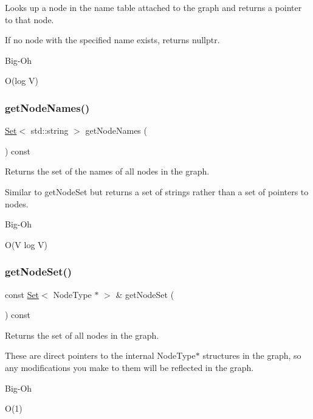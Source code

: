 Looks up a node in the name table attached to the graph and returns a pointer to that node. 

If no node with the specified name exists, returns {\ttfamily nullptr}. \begin{DoxyRefDesc}{Big-\/\+Oh}
\item[\mbox{\hyperlink{BigOh__BigOh000075}{Big-\/\+Oh}}]O(log V) \end{DoxyRefDesc}
\mbox{\label{classGraph_a3c6f37932f377dd2bf4fec61343a916d}} 
\subsubsection{\texorpdfstring{get\+Node\+Names()}{getNodeNames()}}
{\footnotesize\ttfamily \mbox{\hyperlink{classstanfordcpplib_1_1collections_1_1GenericSet}{Set}}$<$ std\+::string $>$ get\+Node\+Names (\begin{DoxyParamCaption}{ }\end{DoxyParamCaption}) const}



Returns the set of the names of all nodes in the graph. 

Similar to get\+Node\+Set but returns a set of strings rather than a set of pointers to nodes. \begin{DoxyRefDesc}{Big-\/\+Oh}
\item[\mbox{\hyperlink{BigOh__BigOh000076}{Big-\/\+Oh}}]O(\+V log V) \end{DoxyRefDesc}
\mbox{\label{classGraph_abd5552888f57aaa581099e8146c617c9}} 
\subsubsection{\texorpdfstring{get\+Node\+Set()}{getNodeSet()}}
{\footnotesize\ttfamily const \mbox{\hyperlink{classstanfordcpplib_1_1collections_1_1GenericSet}{Set}}$<$ Node\+Type $\ast$ $>$ \& get\+Node\+Set (\begin{DoxyParamCaption}{ }\end{DoxyParamCaption}) const}



Returns the set of all nodes in the graph. 

These are direct pointers to the internal Node\+Type$\ast$ structures in the graph, so any modifications you make to them will be reflected in the graph. \begin{DoxyRefDesc}{Big-\/\+Oh}
\item[\mbox{\hyperlink{BigOh__BigOh000077}{Big-\/\+Oh}}]O(1) \end{DoxyRefDesc}
\mbox{\label{classGraph_a54164ab847f3a5c7fe15d15ac95af443}} 
